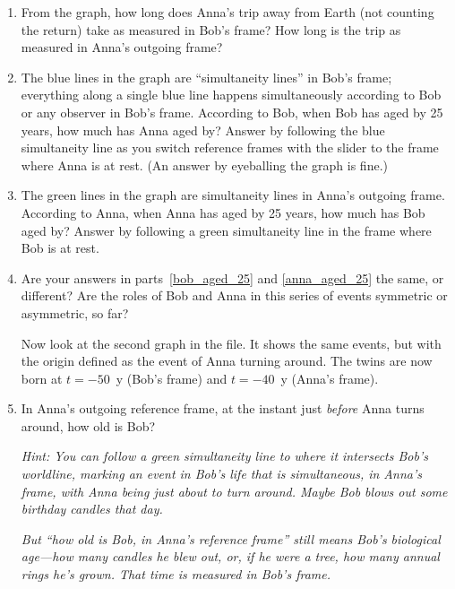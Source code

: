 \begin{enumerate}[wide]
\item  From the graph, how long does Anna's trip away from Earth (not counting the return) take as measured in Bob's frame? How long is the trip as measured in Anna's outgoing frame?
\answerspace{0.8in}

\item The blue lines in the graph are ``simultaneity lines'' in Bob's frame; everything along a single blue line happens simultaneously according to Bob or any observer in Bob's frame. According to Bob, when Bob has aged by 25 years, how much has Anna aged by? Answer by following the blue simultaneity line as you switch reference frames with the slider to the frame where Anna is at rest. (An answer by eyeballing the graph is fine.) \label{bob_aged_25}
\answerspace{0.8in}

\item The green lines in the graph are simultaneity lines in Anna's outgoing frame. According to Anna, when Anna has aged by 25 years, how much has Bob aged by?  Answer by following a green simultaneity line in the frame where Bob is at rest. \label{anna_aged_25}
\answerspace{0.8in}

\item Are your answers in parts~\ref{bob_aged_25} and \ref{anna_aged_25} the same, or different? Are the roles of Bob and Anna in this series of events symmetric or asymmetric, so far?
\answerspace{0.8in}

\pagebreak[3]
Now look at the second graph in the file. It shows the same events, but with the origin defined as the event of Anna turning around.  The twins are now born at $t=-50$~y (Bob's frame) and $t=-40$~y (Anna's frame).
\medskip

\item In Anna's outgoing reference frame, at the instant just \textit{before} Anna turns around, how old is Bob?  

\textit{Hint: You can follow a green simultaneity line to where it intersects Bob's worldline, marking an event in Bob's life that is simultaneous, in Anna's frame, with Anna being just about to turn around.  
Maybe Bob blows out some birthday candles that day.}

\textit{But ``how old is Bob, in Anna's reference frame'' still means Bob's biological age---how many candles he blew out, or, if he were a tree, how many annual rings he's grown.  That time is measured in Bob's frame.}

\answerspace{0.8in}


\end{enumerate}
